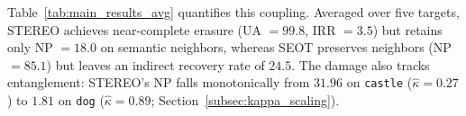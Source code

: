 Table~\ref{tab:main_results_avg} quantifies this coupling. Averaged over five targets, STEREO achieves near-complete erasure (UA $=99.8$, IRR $=3.5$) but retains only NP $=18.0$ on semantic neighbors, whereas SEOT preserves neighbors (NP $=85.1$) but leaves an indirect recovery rate of $24.5$. The damage also tracks entanglement: STEREO's NP falls monotonically from $31.96$ on \texttt{castle} ($\hat\kappa=0.27$) to $1.81$ on \texttt{dog} ($\hat\kappa=0.89$; Section~\ref{subsec:kappa_scaling}).


